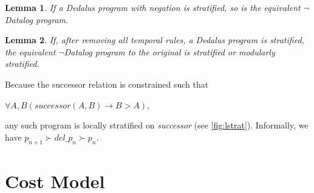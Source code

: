 \documentclass{acm_proc_article-sp-sigmod09}
\begin{document}
\newtheorem{lemma}{Lemma}
\begin{lemma}
If a Dedalus program with negation is stratified, so is the equivalent $\lnot$Datalog program.
\end{lemma}

\begin{lemma}
If, after removing all temporal rules, a Dedalus program is stratified, the equivalent $\lnot$Datalog program to the original
is stratified or modularly stratified.
\end{lemma}

 Because the successor relation is constrained
such that 

$\forall A,B (successor(A, B) \rightarrow B > A)$, 

any such program is locally stratified on \emph{successor} (see \ref{fig:lstrat}).  Informally,
we have $p_{n+1} \succ del\_p_{n} \succ p_{n}$.

\section{Cost Model}
\end{document}
